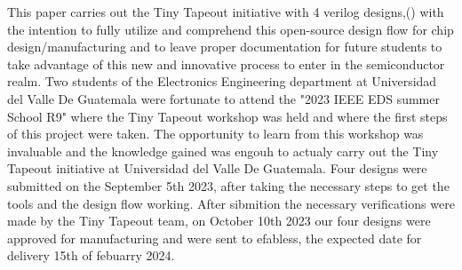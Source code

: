This paper carries out the Tiny Tapeout initiative with 4 verilog designs,() 
with the intention to fully utilize and comprehend this open-source design 
flow for chip design/manufacturing and to leave proper documentation for future 
students to take advantage of this new and innovative process to enter in the 
semiconductor realm.
Two students of the Electronics Engineering department at Universidad del Valle De Guatemala were 
fortunate to attend the "2023 IEEE EDS summer School R9" where the Tiny Tapeout workshop was 
held and where the first steps of this project were taken. The opportunity to learn from this 
workshop was invaluable and the knowledge gained was engouh to actualy carry out the 
Tiny Tapeout initiative at Universidad del Valle De Guatemala. Four designs were submitted 
on the September 5th 2023, after taking the necessary steps to get the tools and the 
design flow working. After sibmition the necessary verifications were made by the 
Tiny Tapeout team, on October 10th 2023 our four designs were approved for manufacturing 
and were sent to efabless, the expected date for delivery 15th of febuarry 2024. 
